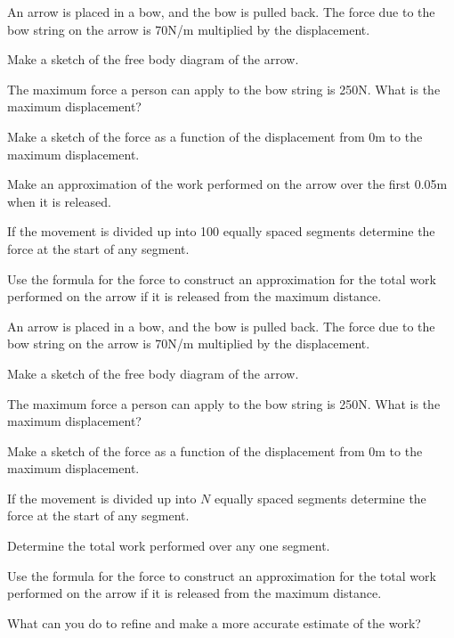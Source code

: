 \begin{problem}
\item An arrow is placed in a bow, and the bow is pulled back. The
  force due to the bow string on the arrow is 70N/m multiplied by the
  displacement. 
  \begin{subproblem}
  \item Make a sketch of the free body diagram of the arrow.
    \vfill
  \item The maximum force a person can apply to the bow string is
    250N. What is the maximum displacement?  
    \vfill
  \item Make a sketch of the force as a function of the displacement
    from 0m to the maximum displacement.
    \vfill
    \clearpage
  \item Make an approximation of the work performed on the arrow over
    the first 0.05m when it is released.
    \vfill
  \item If the movement is divided up into 100 equally spaced segments
    determine the force at the start of any segment.
    \vfill
  \item Use the formula for the force to construct an approximation
    for the total work performed on the arrow if it is released from
    the maximum distance.
    \vfill
  \end{subproblem}
\end{problem}

\begin{problem}
\item An arrow is placed in a bow, and the bow is pulled back. The
  force due to the bow string on the arrow is 70N/m multiplied by the
  displacement. 
  \begin{subproblem}
  \item Make a sketch of the free body diagram of the arrow.
      \vfill
  \item The maximum force a person can apply to the bow string is
    250N. What is the maximum displacement?  
    \vfill
  \item Make a sketch of the force as a function of the displacement
    from 0m to the maximum displacement.
    \vfill
    \clearpage
  \item If the movement is divided up into $N$ equally spaced segments
    determine the force at the start of any segment.
    \vfill
  \item Determine the total work performed over any one segment.
    \vfill
  \item Use the formula for the force to construct an approximation
    for the total work performed on the arrow if it is released from
    the maximum distance.
    \vfill
  \item What can you do to refine and make a more accurate estimate of
    the work?
  \end{subproblem}
\end{problem}

